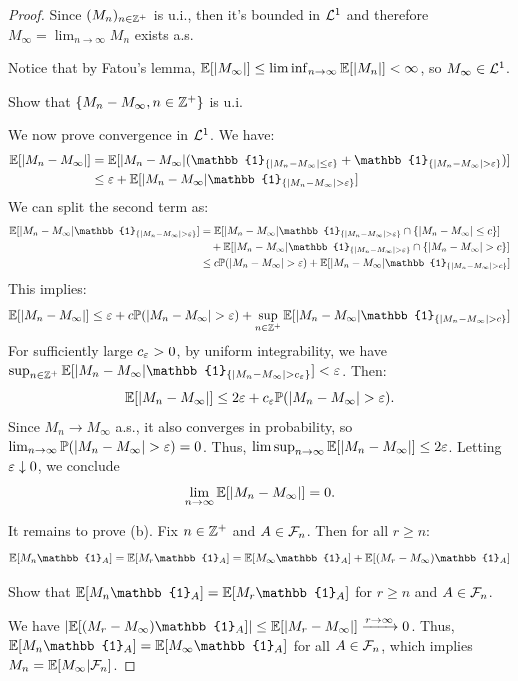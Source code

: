 \begin{proof}
    Since $(M_n)_{n \in \mathbb Z^+}$ is u.i., then it's bounded in $\mathcal{L}^1$ and therefore $M_\infty = \lim_{n \to \infty} M_n$ exists a.s.
    
    Notice that by Fatou's lemma, $\mathbb E[|M_\infty|] \leq \liminf_{n \to \infty} \mathbb E[|M_n|] < \infty$, so $M_\infty \in \mathcal{L}^1$.
    
    \begin{homework}
        Show that $\{M_n - M_\infty, n \in \mathbb Z^+\}$ is u.i.
    \end{homework}
    
    We now prove convergence in $\mathcal{L}^1$. We have:
    \begin{align*}
        \EE[|M_n - M_\infty|] &= \EE[|M_n - M_\infty| (\mathbb{1}_{\{|M_n - M_\infty| \leq \eps\}} + \mathbb{1}_{\{|M_n - M_\infty| > \eps\}})] \\
        &\leq \eps + \EE[|M_n - M_\infty| \mathbb{1}_{\{|M_n - M_\infty| > \eps\}}]
    \end{align*}
    We can split the second term as:
    \begin{align*}
        \EE[|M_n - M_\infty| \mathbb{1}_{\{|M_n - M_\infty| > \eps\}}] &= \EE[|M_n - M_\infty| \mathbb{1}_{\{|M_n - M_\infty| > \eps\}} \cap \{|M_n - M_\infty| \leq c\}] \\
        &\quad + \EE[|M_n - M_\infty| \mathbb{1}_{\{|M_n - M_\infty| > \eps\}} \cap \{|M_n - M_\infty| > c\}] \\
        &\leq c \PP(|M_n - M_\infty| > \eps) + \EE[|M_n - M_\infty| \mathbb{1}_{\{|M_n - M_\infty| > c\}}]
    \end{align*}
    This implies:
    \[ \EE[|M_n - M_\infty|] \leq \eps + c \PP(|M_n - M_\infty| > \eps) + \sup_{n \in \ZZ^+} \EE[|M_n - M_\infty| \mathbb{1}_{\{|M_n - M_\infty| > c\}}] \]
    For sufficiently large $c_\varepsilon > 0$, by uniform integrability, we have $\sup_{n \in \ZZ^+} \EE[|M_n - M_\infty| \mathbb{1}_{\{|M_n - M_\infty| > c_\eps\}}] < \eps$.
    Then:
    \[ \mathbb E[|M_n - M_\infty|] \leq 2\varepsilon + c_\varepsilon \mathbb P(|M_n - M_\infty| > \varepsilon). \]
    Since $M_n \to M_\infty$ a.s., it also converges in probability, so $\lim_{n \to \infty} \mathbb P(|M_n - M_\infty| > \varepsilon) = 0$.
    Thus, $\limsup_{n \to \infty} \mathbb E[|M_n - M_\infty|] \leq 2\varepsilon$. Letting $\varepsilon \downarrow 0$, we conclude
    \[ \lim_{n \to \infty} \mathbb E[|M_n - M_\infty|] = 0. \]
    
    It remains to prove (b). Fix $n \in \mathbb Z^+$ and $A \in \mathcal{F}_n$. Then for all $r \geq n$:
    \[ \EE[M_n \mathbb{1}_A] = \EE[M_r \mathbb{1}_A] = \EE[M_\infty \mathbb{1}_A] + \EE[(M_r - M_\infty) \mathbb{1}_A] \]
    
    \begin{homework}
        Show that $\EE[M_n \mathbb{1}_A] = \EE[M_r \mathbb{1}_A]$ for $r \geq n$ and $A \in \mathcal{F}_n$.
    \end{homework}
    
    We have $|\EE[(M_r - M_\infty) \mathbb{1}_A]| \leq \EE[|M_r - M_\infty|] \xrightarrow{r \to \infty} 0$.
    Thus, $\EE[M_n \mathbb{1}_A] = \EE[M_\infty \mathbb{1}_A]$ for all $A \in \mathcal{F}_n$, which implies $M_n = \mathbb E[M_\infty | \mathcal{F}_n]$.
\end{proof}

